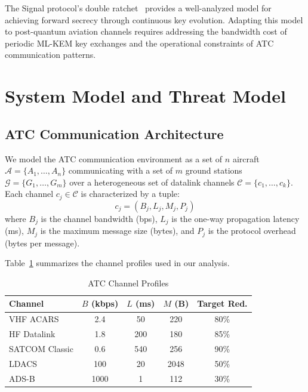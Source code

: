 \documentclass[conference,10pt]{IEEEtran}
\begin{document}
The Signal protocol's double ratchet~\cite{cohn2020formal, alwen2020double} provides a well-analyzed model for achieving forward secrecy through continuous key evolution. Adapting this model to post-quantum aviation channels requires addressing the bandwidth cost of periodic ML-KEM key exchanges and the operational constraints of ATC communication patterns.

\section{System Model and Threat Model}
\label{sec:model}

\subsection{ATC Communication Architecture}

We model the ATC communication environment as a set of $n$ aircraft $\mathcal{A} = \{A_1, \ldots, A_n\}$ communicating with a set of $m$ ground stations $\mathcal{G} = \{G_1, \ldots, G_m\}$ over a heterogeneous set of datalink channels $\mathcal{C} = \{c_1, \ldots, c_k\}$. Each channel $c_j \in \mathcal{C}$ is characterized by a tuple:
\begin{equation}
    c_j = (B_j, L_j, M_j, P_j)
\end{equation}
where $B_j$ is the channel bandwidth (bps), $L_j$ is the one-way propagation latency (ms), $M_j$ is the maximum message size (bytes), and $P_j$ is the protocol overhead (bytes per message).

Table~\ref{tab:channel_profiles} summarizes the channel profiles used in our analysis.

\begin{table}[t]
\centering
\caption{ATC Channel Profiles}
\label{tab:channel_profiles}
\begin{tabular}{lcccc}
\toprule
\textbf{Channel} & $B$ \textbf{(kbps)} & $L$ \textbf{(ms)} & $M$ \textbf{(B)} & \textbf{Target Red.} \\
\midrule
VHF ACARS & 2.4 & 50 & 220 & 80\% \\
HF Datalink & 1.8 & 200 & 180 & 85\% \\
SATCOM Classic & 0.6 & 540 & 256 & 90\% \\
LDACS & 100 & 20 & 2048 & 50\% \\
ADS-B & 1000 & 1 & 112 & 30\% \\
\bottomrule
\end{tabular}
\end{table}
\end{document}
